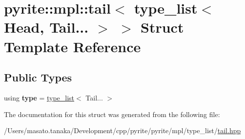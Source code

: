 \hypertarget{structpyrite_1_1mpl_1_1tail_3_01type__list_3_01_head_00_01_tail_8_8_8_01_4_01_4}{}\section{pyrite\+:\+:mpl\+:\+:tail$<$ type\+\_\+list$<$ Head, Tail... $>$ $>$ Struct Template Reference}
\label{structpyrite_1_1mpl_1_1tail_3_01type__list_3_01_head_00_01_tail_8_8_8_01_4_01_4}
\subsection*{Public Types}
\begin{DoxyCompactItemize}
\item 
\mbox{\label{structpyrite_1_1mpl_1_1tail_3_01type__list_3_01_head_00_01_tail_8_8_8_01_4_01_4_a33fa4772cd6f330f68a17f9d6a1236d4}} 
using {\bfseries type} = \mbox{\hyperlink{structpyrite_1_1core_1_1mpl_1_1type__list}{type\+\_\+list}}$<$ Tail... $>$
\end{DoxyCompactItemize}


The documentation for this struct was generated from the following file\+:\begin{DoxyCompactItemize}
\item 
/\+Users/masato.\+tanaka/\+Development/cpp/pyrite/pyrite/mpl/type\+\_\+list/\mbox{\hyperlink{tail_8hpp}{tail.\+hpp}}\end{DoxyCompactItemize}
